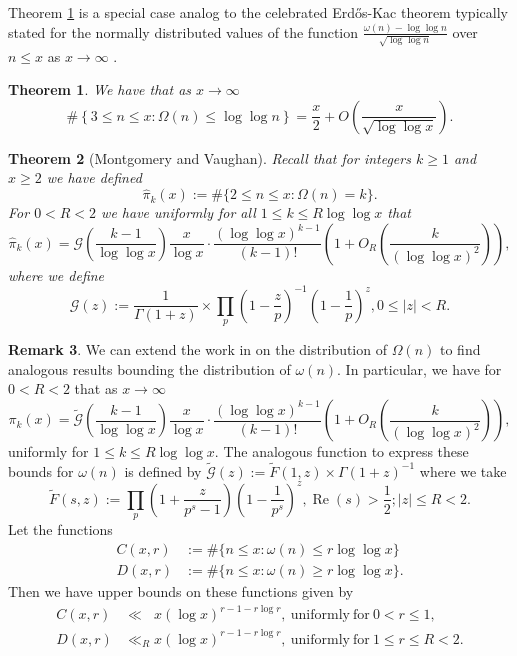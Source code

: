 \documentclass[11pt,reqno,a4letter]{article}
\numberwithin{figure}{section}
\numberwithin{table}{section}
\newcommand{\cf}{\textit{cf.\ }}
\theoremstyle{plain}
\newtheorem{theorem}{Theorem}
\numberwithin{theorem}{section}
\theoremstyle{definition}
\newtheorem{remark}[theorem]{Remark}
\renewcommand{\Re}{\operatorname{Re}}
\begin{document}
Theorem \ref{theorem_MV_Thm7.21-init_stmt} is a special case analog to the 
celebrated Erd\H{o}s-Kac theorem typically stated for the 
normally distributed values of the function 
$\frac{\omega(n) - \log\log n}{\sqrt{\log\log n}}$ over $n \leq x$ as 
$x \rightarrow \infty$ \cite[\cf Thm.\ 7.21]{MV} \cite[\cf \S 1.7]{IWANIEC-KOWALSKI}. 

\begin{theorem}
\label{theorem_MV_Thm7.21-init_stmt} 
We have that as $x \rightarrow \infty$ 
\[
\#\left\{3 \leq n \leq x: \Omega(n) \leq \log\log n \right\} = 
     \frac{x}{2} + O\left(\frac{x}{\sqrt{\log\log x}}\right). 
\]
\end{theorem} 

\begin{theorem}[Montgomery and Vaughan]
\label{theorem_HatPi_ExtInTermsOfGz} 
Recall that for integers $k \geq 1$ and $x \geq 2$ we have defined 
$$\widehat{\pi}_k(x) := \#\{2 \leq n \leq x: \Omega(n)=k\}.$$ 
For $0 < R < 2$ we have uniformly for all $1 \leq k \leq R \log\log x$ that 
\[
\widehat{\pi}_k(x) = \mathcal{G}\left(\frac{k-1}{\log\log x}\right) \frac{x}{\log x} \cdot 
     \frac{(\log\log x)^{k-1}}{(k-1)!} \left(1 + O_R\left(\frac{k}{(\log\log x)^2}\right)\right), 
\]
where we define 
\[
\mathcal{G}(z) := \frac{1}{\Gamma(1+z)} \times 
     \prod_p \left(1-\frac{z}{p}\right)^{-1} \left(1-\frac{1}{p}\right)^z, 0 \leq |z| < R. 
\]
\end{theorem} 

\begin{remark} 
\label{remark_MV_Pikx_FuncResultsAnnotated_v1} 
We can extend the work in \cite{MV} on the distribution of $\Omega(n)$ to find 
analogous results bounding the distribution of $\omega(n)$. In particular, we have 
for $0 < R < 2$ that as $x \rightarrow \infty$ 
\begin{equation}
\label{eqn_Pikx_UniformAsymptoticsStmt_from_MV_v2} 
\pi_k(x) = \widetilde{\mathcal{G}}\left(\frac{k-1}{\log\log x}\right) 
     \frac{x}{\log x} \cdot \frac{(\log\log x)^{k-1}}{(k-1)!} \left( 
     1 + O_R\left(\frac{k}{(\log\log x)^2}\right) 
     \right), 
\end{equation}
uniformly for $1 \leq k \leq R\log\log x$. 
The analogous function to express these bounds for $\omega(n)$ is 
defined by $\widetilde{\mathcal{G}}(z) := \widetilde{F}(1, z) \times \Gamma(1+z)^{-1}$ where 
we take 
\[
\widetilde{F}(s, z) := \prod_p \left(1 + \frac{z}{p^s-1}\right) \left(1 - \frac{1}{p^s}\right)^{z}, 
     \Re(s) > \frac{1}{2}; |z| \leq R < 2. 
\]
Let the functions 
\begin{align*} 
C(x, r) & := \#\{n \leq x: \omega(n) \leq r \log\log x\} \\ 
D(x, r) & := \#\{n \leq x: \omega(n) \geq r \log\log x\}. 
\end{align*} 
Then we have upper bounds on these functions given by 
\begin{align*} 
C(x, r) & \ll\phantom{_R} x (\log x)^{r - 1 - r \log r}, \mathrm{\ uniformly\ for\ } 0 < r \leq 1, \\ 
D(x, r) & \ll_R x (\log x)^{r - 1 - r \log r}, \mathrm{\ uniformly\ for\ } 1 \leq r \leq R < 2.
\end{align*} 
\end{remark} 
\end{document}
